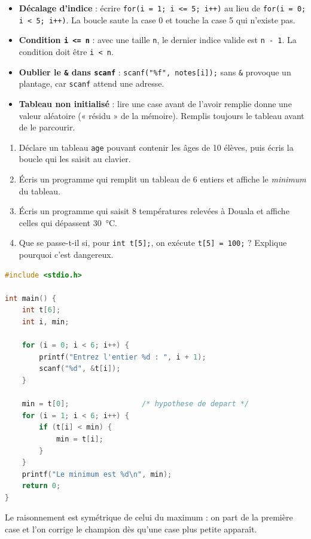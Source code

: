 \documentclass[11pt]{article}
\newcounter{popsec}
\newcounter{popsub}
\newcommand{\courssub}[1]{%
  \stepcounter{popsub}%
  \par\vspace{9pt}\noindent{\popxbold\fontsize{11.5}{13}\selectfont\color{popink}{\color{poporange}\thepopsec.\thepopsub}\hspace{6pt}#1}\par\nopagebreak\vspace{4pt}
}
\begin{document}
\begin{attention}
\begin{itemize}
  \item \textbf{Décalage d'indice} : écrire \texttt{for(i = 1; i <= 5; i++)} au lieu de \texttt{for(i = 0; i < 5; i++)}. La boucle saute la case 0 et touche la case 5 qui n'existe pas.
  \item \textbf{Condition \texttt{i <= n}} : avec une taille \texttt{n}, le dernier indice valide est \texttt{n - 1}. La condition doit être \texttt{i < n}.
  \item \textbf{Oublier le \texttt{\&} dans \texttt{scanf}} : \texttt{scanf("\%f", notes[i]);} sans \texttt{\&} provoque un plantage, car \texttt{scanf} attend une adresse.
  \item \textbf{Tableau non initialisé} : lire une case avant de l'avoir remplie donne une valeur aléatoire (« résidu » de la mémoire). Remplis toujours le tableau avant de le parcourir.
\end{itemize}
\end{attention}

\courssub{Exercices d'application}

\begin{exercice}
\begin{enumerate}
  \item Déclare un tableau \texttt{age} pouvant contenir les âges de 10 élèves, puis écris la boucle qui les saisit au clavier.
  \item Écris un programme qui remplit un tableau de 6 entiers et affiche le \emph{minimum} du tableau.
  \item Écris un programme qui saisit 8 températures relevées à Douala et affiche celles qui dépassent \SI{30}{\celsius}.
  \item Que se passe-t-il si, pour \texttt{int t[5];}, on exécute \texttt{t[5] = 100;} ? Explique pourquoi c'est dangereux.
\end{enumerate}
\end{exercice}

\begin{corrige}[Exercice 2]
\begin{lstlisting}[language=C]
#include <stdio.h>

int main() {
    int t[6];
    int i, min;

    for (i = 0; i < 6; i++) {
        printf("Entrez l'entier %d : ", i + 1);
        scanf("%d", &t[i]);
    }

    min = t[0];                 /* hypothese de depart */
    for (i = 1; i < 6; i++) {
        if (t[i] < min) {
            min = t[i];
        }
    }
    printf("Le minimum est %d\n", min);
    return 0;
}
\end{lstlisting}
Le raisonnement est symétrique de celui du maximum : on part de la première case et l'on corrige le champion dès qu'une case plus petite apparaît.
\end{corrige}
\end{document}
